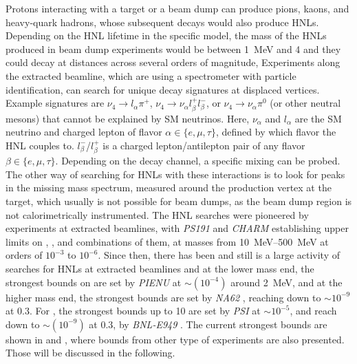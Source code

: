 Protons interacting with a target or a beam dump can produce pions, kaons, and heavy-quark hadrons, whose subsequent decays would also produce HNLs. Depending on the HNL lifetime in the specific model, the mass of the HNLs produced in beam dump experiments would be between \SI{1}{\mega\electronvolt} and \SI{4}{\gev} and they could decay at distances across several orders of magnitude, Experiments along the extracted beamline, which are using a spectrometer with particle identification, can search for unique decay signatures at displaced vertices. Example signatures are $\nu_4 \rightarrow l_\alpha \pi^+$, $\nu_4 \rightarrow \nu_\alpha l^+_\beta l^-_\beta$, or $\nu_4 \rightarrow \nu_\alpha \pi^0$ (or other neutral mesons) that cannot be explained by SM neutrinos. Here, $\nu_\alpha$ and $l_\alpha$ are the SM neutrino and charged lepton of flavor $\alpha \in \{e,\mu,\tau\}$, defined by which flavor the HNL couples to. $l^-_\beta$/$l^+_\beta$ is a charged lepton/antilepton pair of any flavor $\beta \in \{e,\mu,\tau\}$. Depending on the decay channel, a specific mixing can be probed. The other way of searching for HNLs with these interactions is to look for peaks in the missing mass spectrum, measured around the production vertex at the target, which usually is not possible for beam dumps, as the beam dump region is not calorimetrically instrumented. The HNL searches were pioneered by experiments at extracted beamlines, with \textit{PS191}  and \textit{CHARM}  establishing upper limits on , , and combinations of them, at masses from \SIrange{10}{500}{\mega\electronvolt} at orders of $10^{-3}$ to $10^{-6}$. Since then, there has been and still is a large activity of searches for HNLs at extracted beamlines and at the lower mass end, the strongest bounds on  are set by \textit{PIENU}  at $\sim(10^{-4})$ around \SI{2}{\mega\electronvolt}, and at the higher mass end, the strongest bounds are set by \textit{NA62} , reaching down to $\sim10^{-9}$ at \SI{0.3}{\gev}. For , the strongest bounds up to \SI{10}{\gev} are set by \textit{PSI}  at $\sim10^{-5}$, and reach down to $\sim(10^{-9})$ at \SI{0.3}{\gev}, by \textit{BNL-E949} . The current strongest bounds are shown in  and , where bounds from other type of experiments are also presented. Those will be discussed in the following.

